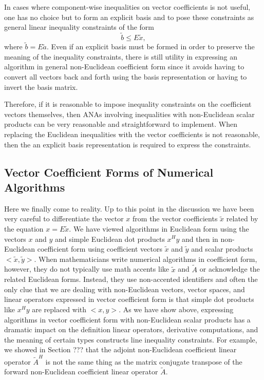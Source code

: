 In cases where component-wise inequalities on vector coefficients is not
useful, one has no choice but to form an explicit basis and to pose these
constraints as general linear inequality constraints of the form
%
\[
\tilde{b} \le E \tilde{x},
\]
%
where $\tilde{b} = E\tilde{a}$.  Even if an explicit basis must be formed in
order to preserve the meaning of the inequality constraints, there is still
utility in expressing an algorithm in general non-Euclidean coefficient form
since it avoids having to convert all vectors back and forth using the basis
representation or having to invert the basis matrix.

Therefore, if it is reasonable to impose inequality constraints on the
coefficient vectors themselves, then ANAs involving inequalities with
non-Euclidean scalar products can be very reasonable and straightforward to
implement.  When replacing the Euclidean inequalities with the vector
coefficients is not reasonable, then the an explicit basis representation is
required to express the constraints.

\subsection{Vector Coefficient Forms of Numerical Algorithms}

Here we finally come to reality.  Up to this point in the discussion we have
been very careful to differentiate the vector $x$ from the vector coefficients
$\tilde{x}$ related by the equation $x = E\tilde{x}$.  We have viewed
algorithms in Euclidean form using the vectors $x$ and $y$ and simple
Euclidean dot products $x^H y$ and then in non-Euclidean coefficient form
using coefficient vectors $\tilde{x}$ and $\tilde{y}$ and scalar products
$<\tilde{x},\tilde{y}>$.  When mathematicians write numerical algorithms in
coefficient form, however, they do not typically use math accents like
$\tilde{x}$ and $\tilde{A}$ or acknowledge the related Euclidean forms.
Instead, they use non-accented identifiers and often the only clue that we
are dealing with non-Euclidean vectors, vector spaces, and linear operators
expressed in vector coefficient form is that simple dot products like $x^H y$
are replaced with $<x,y>$.  As we have show above, expressing algorithms in
vector coefficient form with non-Euclidean scalar products has a dramatic
impact on the definition linear operators, derivative computations, and the
meaning of certain types constructs line inequality constraints.  For example,
we showed in Section ??? that the adjoint non-Euclidean coefficient linear
operator $\tilde{A}^H$ is not the same thing as the matrix conjugate transpose
of the forward non-Euclidean coefficient linear operator $\tilde{A}$.

